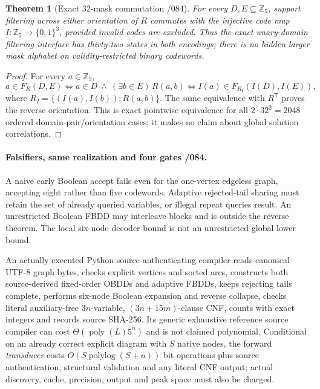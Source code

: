 \documentclass[11pt]{article}
\newtheorem{theorem}{Theorem}
\begin{document}
\begin{theorem}[Exact 32-mask commutation /084]
For every $D,E\subseteq\mathbb Z_5$, support filtering across
either orientation of $R$ commutes with the injective code map
$I:\mathbb Z_5\to\{0,1\}^3$, provided invalid codes are excluded.
Thus the exact unary-domain filtering interface has thirty-two
states in both encodings; there is no hidden larger mask
alphabet on validity-restricted binary codewords.
\end{theorem}
\begin{proof}
For every $a\in\mathbb Z_5$,
\[
 a\in F_R(D,E)
 \iff a\in D\ \wedge\ (\exists b\in E)\,R(a,b)
 \iff I(a)\in F_{R_I}(I(D),I(E)),
\]
where $R_I=\{(I(a),I(b)):R(a,b)\}$.
The same equivalence with $R^{\mathsf T}$ proves the reverse
orientation. This is exact pointwise equivalence for all
$2\cdot32^2=2048$ ordered domain-pair/orientation cases;
it makes no claim about global solution correlations.
\end{proof}

\paragraph{Falsifiers, same realization and four gates /084.}
A naive early Boolean accept fails even for the one-vertex
edgeless graph, accepting eight rather than five codewords.
Adaptive rejected-tail sharing must retain the set of
already queried variables, or illegal repeat queries result.
An unrestricted Boolean FBDD may interleave blocks and is
outside the reverse theorem. The local six-node decoder
bound is not an unrestricted global lower bound.

An actually executed Python source-authenticating compiler
reads canonical UTF-8 graph bytes, checks explicit vertices
and sorted arcs, constructs both source-derived fixed-order
OBDDs and adaptive FBDDs, keeps rejecting tails complete,
performs six-node Boolean expansion and reverse collapse,
checks literal auxiliary-free $3n$-variable,
$(3n+15m)$-clause CNF, counts with exact integers and
records source SHA-256. Its generic exhaustive reference
source compiler can cost $\Theta(\operatorname{poly}(L)5^n)$
and is not claimed polynomial. Conditional on an already
correct explicit diagram with $S$ native nodes, the forward
\emph{transducer} costs $O(S\operatorname{polylog}(S+n))$
bit operations plus source authentication, structural
validation and any literal CNF output; actual discovery,
cache, precision, output and peak space must also be charged.
\end{document}
